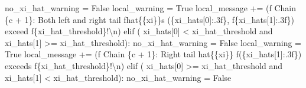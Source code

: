 \documentclass[
  letterpaper,
  DIV=11,
  numbers=noendperiod]{scrartcl}
\newenvironment{Shaded}{\begin{snugshade}}{\end{snugshade}}
\newcommand{\CharTok}[1]{\textcolor[rgb]{0.13,0.47,0.30}{#1}}
\newcommand{\ControlFlowTok}[1]{\textcolor[rgb]{0.00,0.23,0.31}{#1}}
\newcommand{\DecValTok}[1]{\textcolor[rgb]{0.68,0.00,0.00}{#1}}
\newcommand{\KeywordTok}[1]{\textcolor[rgb]{0.00,0.23,0.31}{#1}}
\newcommand{\NormalTok}[1]{\textcolor[rgb]{0.00,0.23,0.31}{#1}}
\newcommand{\OperatorTok}[1]{\textcolor[rgb]{0.37,0.37,0.37}{#1}}
\newcommand{\SpecialCharTok}[1]{\textcolor[rgb]{0.37,0.37,0.37}{#1}}
\newcommand{\SpecialStringTok}[1]{\textcolor[rgb]{0.13,0.47,0.30}{#1}}
\newcommand{\VariableTok}[1]{\textcolor[rgb]{0.07,0.07,0.07}{#1}}
\begin{document}
\begin{Shaded}
\begin{Highlighting}[]
\NormalTok{        no\_xi\_hat\_warning }\OperatorTok{=} \VariableTok{False}
\NormalTok{        local\_warning }\OperatorTok{=} \VariableTok{True}
\NormalTok{        local\_message }\OperatorTok{+=}\NormalTok{ (}\SpecialStringTok{f\textquotesingle{}  Chain }\SpecialCharTok{\{}\NormalTok{c }\OperatorTok{+} \DecValTok{1}\SpecialCharTok{\}}\SpecialStringTok{: Both left and right tail \textquotesingle{}}
                          \SpecialStringTok{f\textquotesingle{}hat}\CharTok{\{\{}\SpecialStringTok{xi}\CharTok{\}\}}\SpecialStringTok{s (}\SpecialCharTok{\{}\NormalTok{xi\_hats[}\DecValTok{0}\NormalTok{]}\SpecialCharTok{:.3f\}}\SpecialStringTok{, \textquotesingle{}}
                          \SpecialStringTok{f\textquotesingle{}}\SpecialCharTok{\{}\NormalTok{xi\_hats[}\DecValTok{1}\NormalTok{]}\SpecialCharTok{:.3f\}}\SpecialStringTok{) exceed \textquotesingle{}}
                          \SpecialStringTok{f\textquotesingle{}}\SpecialCharTok{\{}\NormalTok{xi\_hat\_threshold}\SpecialCharTok{\}}\SpecialStringTok{!}\CharTok{\textbackslash{}n}\SpecialStringTok{\textquotesingle{}}\NormalTok{)}
      \ControlFlowTok{elif}\NormalTok{ (    xi\_hats[}\DecValTok{0}\NormalTok{] }\OperatorTok{\textless{}}\NormalTok{ xi\_hat\_threshold }
            \KeywordTok{and}\NormalTok{ xi\_hats[}\DecValTok{1}\NormalTok{] }\OperatorTok{\textgreater{}=}\NormalTok{ xi\_hat\_threshold):}
\NormalTok{        no\_xi\_hat\_warning }\OperatorTok{=} \VariableTok{False}
\NormalTok{        local\_warning }\OperatorTok{=} \VariableTok{True}
\NormalTok{        local\_message }\OperatorTok{+=}\NormalTok{ (}\SpecialStringTok{f\textquotesingle{}  Chain }\SpecialCharTok{\{}\NormalTok{c }\OperatorTok{+} \DecValTok{1}\SpecialCharTok{\}}\SpecialStringTok{: Right tail hat}\CharTok{\{\{}\SpecialStringTok{xi}\CharTok{\}\}}\SpecialStringTok{ \textquotesingle{}}
                          \SpecialStringTok{f\textquotesingle{}(}\SpecialCharTok{\{}\NormalTok{xi\_hats[}\DecValTok{1}\NormalTok{]}\SpecialCharTok{:.3f\}}\SpecialStringTok{) exceeds \textquotesingle{}}
                          \SpecialStringTok{f\textquotesingle{}}\SpecialCharTok{\{}\NormalTok{xi\_hat\_threshold}\SpecialCharTok{\}}\SpecialStringTok{!}\CharTok{\textbackslash{}n}\SpecialStringTok{\textquotesingle{}}\NormalTok{)}
      \ControlFlowTok{elif}\NormalTok{ (    xi\_hats[}\DecValTok{0}\NormalTok{] }\OperatorTok{\textgreater{}=}\NormalTok{ xi\_hat\_threshold }
            \KeywordTok{and}\NormalTok{ xi\_hats[}\DecValTok{1}\NormalTok{] }\OperatorTok{\textless{}}\NormalTok{ xi\_hat\_threshold):}
\NormalTok{        no\_xi\_hat\_warning }\OperatorTok{=} \VariableTok{False}

\end{Highlighting}
\end{Shaded}
\end{document}
